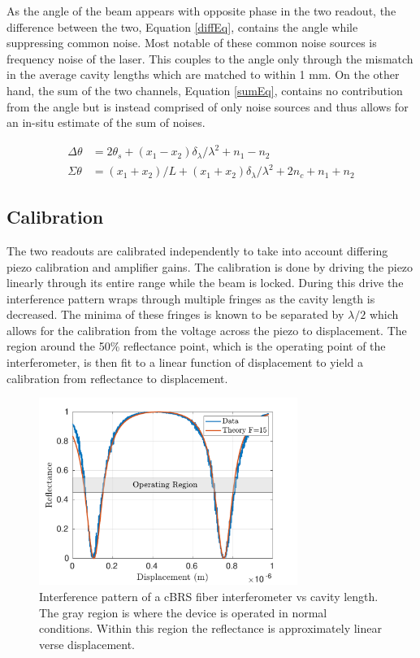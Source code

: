 \documentclass [12pt, proquest]{uwthesis}[2019]
\begin{document}
As the angle of the beam appears with opposite phase in the two readout, the difference between the two, Equation \ref{diffEq}, contains the angle while suppressing common noise. Most notable of these common noise sources is frequency noise of the laser. This couples to the angle only through the mismatch in the average cavity lengths which are matched to within 1 mm. On the other hand, the sum of the two channels, Equation \ref{sumEq}, contains no contribution from the angle but is instead comprised of only noise sources and thus allows for an in-situ estimate of the sum of noises.


\begin{align}
\Delta \theta&=2\theta_s+ (x_1-x_2)\delta_\lambda/\lambda^2+n_1-n_2 \label{diffEq} \\
\Sigma \theta&=(x_1+x_2)/L+ (x_1+x_2)\delta_\lambda/\lambda^2+2n_c+n_1+n_2 \label{sumEq}
\end{align}

\subsection{Calibration}

The two readouts are calibrated independently to take into account differing piezo calibration and amplifier gains. The calibration is done by driving the piezo linearly through its entire range while the beam is locked. During this drive the interference pattern wraps through multiple fringes as the cavity length is decreased. The minima of these fringes is known to be separated by $\lambda/2$ which allows for the calibration from the voltage across the piezo to displacement. The region around the 50\% reflectance point, which is the operating point of the interferometer, is then fit to a linear function of displacement to yield a calibration from reflectance to displacement.  

\begin{figure}[!h]
\begin{center}
 \includegraphics[width=0.75\textwidth]{cBRS_Fringes.pdf}
\caption[Interference pattern of a cBRS fiber interferometer vs cavity length]{Interference pattern of a cBRS fiber interferometer vs cavity length. The gray region is where the device is operated in normal conditions. Within this region the reflectance is approximately linear verse displacement.}
\label{cBRS_fringes}
\end{center}
\end{figure}
\end{document}
